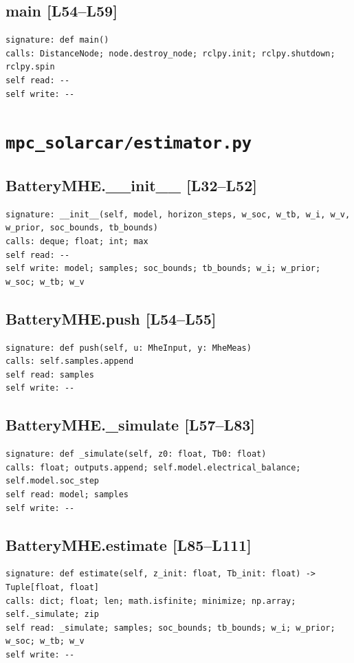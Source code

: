 \documentclass[a4paper,10pt,oneside]{book}
\begin{document}
\subsection*{main [L54--L59]}
\begin{lstlisting}[numbers=none]
signature: def main()
calls: DistanceNode; node.destroy_node; rclpy.init; rclpy.shutdown; rclpy.spin
self read: --
self write: --
\end{lstlisting}
\section{\texttt{mpc\_solarcar/estimator.py}}
\subsection*{BatteryMHE.\_\_init\_\_ [L32--L52]}
\begin{lstlisting}[numbers=none]
signature: __init__(self, model, horizon_steps, w_soc, w_tb, w_i, w_v, w_prior, soc_bounds, tb_bounds)
calls: deque; float; int; max
self read: --
self write: model; samples; soc_bounds; tb_bounds; w_i; w_prior; w_soc; w_tb; w_v
\end{lstlisting}
\subsection*{BatteryMHE.push [L54--L55]}
\begin{lstlisting}[numbers=none]
signature: def push(self, u: MheInput, y: MheMeas)
calls: self.samples.append
self read: samples
self write: --
\end{lstlisting}
\subsection*{BatteryMHE.\_simulate [L57--L83]}
\begin{lstlisting}[numbers=none]
signature: def _simulate(self, z0: float, Tb0: float)
calls: float; outputs.append; self.model.electrical_balance; self.model.soc_step
self read: model; samples
self write: --
\end{lstlisting}
\subsection*{BatteryMHE.estimate [L85--L111]}
\begin{lstlisting}[numbers=none]
signature: def estimate(self, z_init: float, Tb_init: float) -> Tuple[float, float]
calls: dict; float; len; math.isfinite; minimize; np.array; self._simulate; zip
self read: _simulate; samples; soc_bounds; tb_bounds; w_i; w_prior; w_soc; w_tb; w_v
self write: --
\end{lstlisting}
\end{document}
